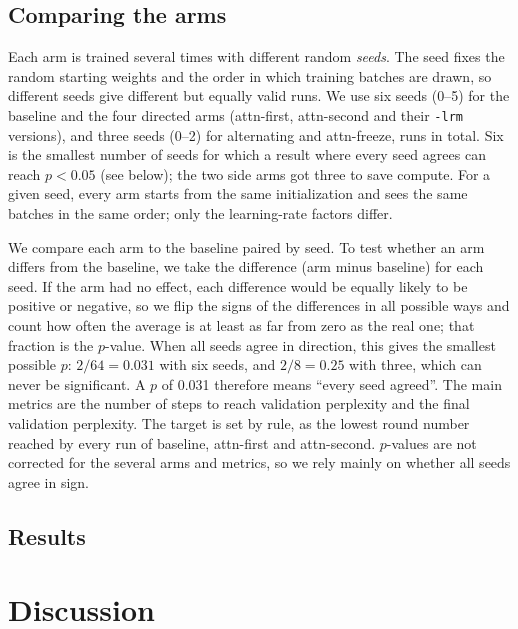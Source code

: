 \documentclass[11pt]{article}
\begin{document}
\subsection{Comparing the arms}
Each arm is trained several times with different random \emph{seeds}. The
seed fixes the random starting weights and the order in which training
batches are drawn, so different seeds give different but equally valid runs.
We use six seeds (0--5) for the baseline and the four directed arms
(attn-first, attn-second and their \texttt{-lrm} versions), and three seeds
(0--2) for alternating and attn-freeze, \PhaseTwoRuns{} runs in total. Six is
the smallest number of seeds for which a result where every seed agrees can
reach $p < 0.05$ (see below); the two side arms got three to save
compute.
For a given seed, every arm starts from the same initialization and sees the same batches in the same order; only the
learning-rate factors differ.

We compare each arm to the baseline paired by seed. To test whether an arm differs from the baseline, we take the difference
(arm minus baseline) for each seed. If the arm had no effect, each difference
would be equally likely to be positive or negative, so we flip the signs of
the differences in all possible ways and count how often the average is at
least as far from zero as the real one; that fraction is the $p$-value. When
all seeds agree in direction, this gives the smallest possible $p$: $2/64 =
0.031$ with six seeds, and $2/8 = 0.25$ with three, which can never be
significant. A $p$ of 0.031 therefore means ``every seed agreed''. The main metrics are the number of steps to reach
validation perplexity \TargetPpl{} and the final validation perplexity. The
target \TargetPpl{} is set by rule, as the lowest round number reached by
every run of baseline, attn-first and attn-second. $p$-values are not corrected
for the several arms and metrics, so we rely mainly on whether all seeds agree
in sign.

\subsection{Results}
\label{sec:results-p2}



\section{Discussion}
\label{sec:discussion}
\end{document}
